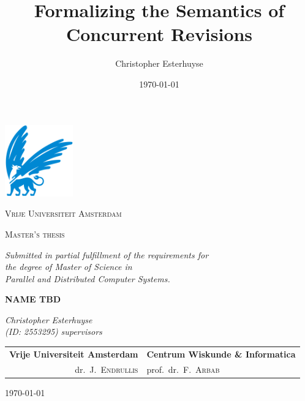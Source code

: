 \documentclass[11pt]{report}
\title{Formalizing the Semantics of Concurrent Revisions}
\author{Christopher Esterhuyse}
\date{\today}
\begin{document}

\begin{titlepage}
	\centering
	\includegraphics[width=0.22\textwidth, trim={0 0.15cm 0 0}, clip]{img/vu.png}
	\par
	{\scshape\huge Vrije Universiteit Amsterdam \par}
	\vspace{1.5cm}
	{\scshape\LARGE Master's thesis\par \par
	\vspace{0.2cm}
	\small \textit{Submitted in partial fulfillment of the requirements for\\ the degree of Master of Science in\\ Parallel and Distributed Computer Systems.}\par}
	\vspace{1.5cm}
	{\Huge\bfseries \rm \textbf{NAME TBD}\par}
	\vspace{1.5cm}
	{\Large\itshape\rm \noindent\textit{Christopher Esterhuyse}\\}
	\vspace{1mm}
	\textit{(ID: 2553295)}
	\vfill
		\rm \noindent \textit{supervisors} \\ \vspace{0.15cm}
	\begin{tabular}{r@{\hskip 0.4in}l}
\rm \hspace{3mm} \textbf{Vrije Universiteit Amsterdam} & \textbf{Centrum Wiskunde \& Informatica} \\ 
dr.\ J.\ \textsc{Endrullis} & prof.\ dr.\ F.\ \textsc{Arbab}
\end{tabular}

	\vfill

	{\large \today\par}
\end{titlepage}
\end{document}
